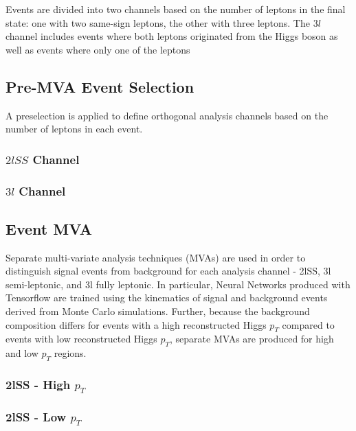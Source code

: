 Events are divided into two channels based on the number of leptons in the final state: one with two same-sign leptons, the other with three leptons. The $3l$ channel includes events where both leptons originated from the Higgs boson as well as events where only one of the leptons 


\subsection{Pre-MVA Event Selection}
\label{subsec:preMVA}

A preselection is applied to define orthogonal analysis channels based on the number of leptons in each event.

\subsubsection{$2lSS$ Channel}

\subsubsection{$3l$ Channel}


\subsection{Event MVA}
\label{subsec:sigBkgMVA}

Separate multi-variate analysis techniques (MVAs) are used in order to distinguish signal events from background for each analysis channel - 2lSS, 3l semi-leptonic, and 3l fully leptonic. In particular, Neural Networks produced with Tensorflow are trained using the kinematics of signal and background events derived from Monte Carlo simulations. Further, because the background composition differs for events with a high reconstructed Higgs $p_T$ compared to events with low reconstructed Higgs $p_T$, separate MVAs are produced for high and low $p_T$ regions.

\subsubsection{2lSS - High $p_T$}
\label{sec:2lHigh}

\subsubsection{2lSS - Low $p_T$}
\label{sec:2lLow}

